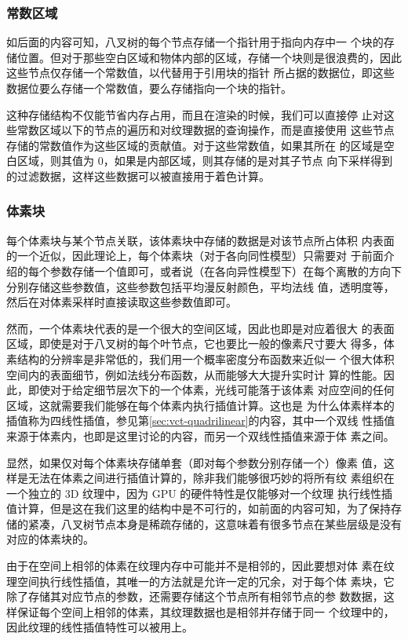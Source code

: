 \subsubsection{常数区域}
如后面的内容可知，八叉树的每个节点存储一个指针用于指向内存中一 个块的存储位置。但对于那些空白区域和物体内部的区域，存储一个块则是很浪费的，因此这些节点仅存储一个常数值，以代替用于引用块的指针 所占据的数据位，即这些数据位要么存储一个常数值，要么存储指向一个块的指针。

这种存储结构不仅能节省内存占用，而且在渲染的时候，我们可以直接停 止对这些常数区域以下的节点的遍历和对纹理数据的查询操作，而是直接使用 这些节点存储的常数值作为这些区域的贡献值。对于这些常数值，如果其所在 的区域是空白区域，则其值为 0，如果是内部区域，则其存储的是对其子节点 向下采样得到的过滤数据，这样这些数据可以被直接用于着色计算。



\subsubsection{体素块}
每个体素块与某个节点关联，该体素块中存储的数据是对该节点所占体积 内表面的一个近似，因此理论上，每个体素块（对于各向同性模型）只需要对 于前面介绍的每个参数存储一个值即可，或者说（在各向异性模型下）在每个离散的方向下分别存储这些参数值，这些参数包括平均漫反射颜色，平均法线 值，透明度等，然后在对体素采样时直接读取这些参数值即可。

然而，一个体素块代表的是一个很大的空间区域，因此也即是对应着很大 的表面区域，即使是对于八叉树的每个叶节点，它也要比一般的像素尺寸要大 得多，体素结构的分辨率是非常低的，我们用一个概率密度分布函数来近似一 个很大体积空间内的表面细节，例如法线分布函数，从而能够大大提升实时计 算的性能。因此，即使对于给定细节层次下的一个体素，光线可能落于该体素 对应空间的任何区域，这就需要我们能够在每个体素内执行插值计算。这也是 为什么体素样本的插值称为四线性插值，参见第\ref{sec:vct-quadrilinear}的内容，其中一个双线 性插值来源于体素内，也即是这里讨论的内容，而另一个双线性插值来源于体 素之间。

显然，如果仅对每个体素块存储单套（即对每个参数分别存储一个）像素 值，这样是无法在体素之间进行插值计算的，除非我们能够很巧妙的将所有纹 素组织在一个独立的 3D 纹理中，因为 GPU 的硬件特性是仅能够对一个纹理 执行线性插值计算，但是这在我们这里的结构中是不可行的，如前面的内容可知，为了保持存储的紧凑，八叉树节点本身是稀疏存储的，这意味着有很多节点在某些层级是没有对应的体素块的。

由于在空间上相邻的体素在纹理内存中可能并不是相邻的，因此要想对体 素在纹理空间执行线性插值，其唯一的方法就是允许一定的冗余，对于每个体 素块，它除了存储其对应节点的参数，还需要存储这个节点所有相邻节点的参 数数据，这样保证每个空间上相邻的体素，其纹理数据也是相邻并存储于同一 个纹理中的，因此纹理的线性插值特性可以被用上。

